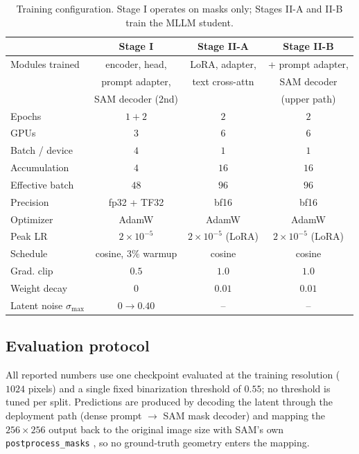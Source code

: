 \begin{table}[!t]
  \centering
  \scriptsize
  \setlength{\tabcolsep}{2.0pt}
  \renewcommand{\arraystretch}{0.98}
  \caption{Training configuration. Stage I operates on masks only; Stages II-A and II-B train the MLLM student.}
  \label{tab:hyper}
  \begin{tabular}{lccc}
    \toprule
    & Stage I & Stage II-A & Stage II-B \\
    \midrule
    Modules trained & encoder, head, & LoRA, adapter, & + prompt adapter, \\
    & prompt adapter, & text cross-attn & SAM decoder \\
    & SAM decoder (2nd) & & (upper path) \\
    Epochs & $1+2$ & $2$ & $2$ \\
    GPUs & $3$ & $6$ & $6$ \\
    Batch / device & $4$ & $1$ & $1$ \\
    Accumulation & $4$ & $16$ & $16$ \\
    Effective batch & $48$ & $96$ & $96$ \\
    Precision & fp32 + TF32 & bf16 & bf16 \\
    Optimizer & AdamW & AdamW & AdamW \\
    Peak LR & $2\times10^{-5}$ & $2\times10^{-5}$ (LoRA) & $2\times10^{-5}$ (LoRA) \\
    Schedule & cosine, $3\%$ warmup & cosine & cosine \\
    Grad. clip & $0.5$ & $1.0$ & $1.0$ \\
    Weight decay & $0$ & $0.01$ & $0.01$ \\
    Latent noise $\sigma_{\max}$ & $0\rightarrow0.40$ & -- & -- \\
    \bottomrule
  \end{tabular}
\end{table}

\subsection{Evaluation protocol}
\label{sec:app_eval}

All reported numbers use one checkpoint evaluated at the training resolution ($1024$ pixels) and a single fixed binarization threshold of $0.55$; no threshold is tuned per split. Predictions are produced by decoding the latent through the deployment path (dense prompt $\rightarrow$ SAM mask decoder) and mapping the $256\times256$ output back to the original image size with SAM's own \texttt{postprocess\_masks} \cite{Kirillov2023SAM}, so no ground-truth geometry enters the mapping.

